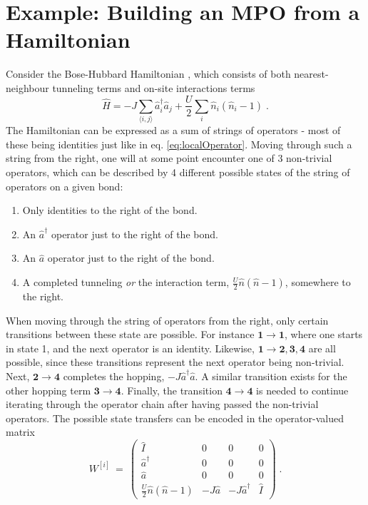 \chapter{Example: Building an MPO from a Hamiltonian}
\label{chap:buildMPO}
Consider the Bose-Hubbard Hamiltonian , which consists of both nearest-neighbour tunneling terms and on-site interactions terms
\begin{equation}
	\hat{H} = - J \sum_{\langle i,j \rangle} \hat{a}_{i}^{\dag} \hat{a}_{j} + \frac{U}{2} \sum_{i} \hat{n}_i \left( \hat{n}_i -1 \right) \; .
	\label{eq:BHhamil}
\end{equation}
The Hamiltonian can be expressed as a sum of strings of operators - most of these being identities just like in eq. \ref{eq:localOperator}. Moving through such a string from the right, one will at some point encounter one of 3 non-trivial operators, which can be described by 4 different possible states of the string of operators on a given bond:
\begin{enumerate}
	\item
	Only identities to the right of the bond.
	\item
	An $\hat{a}^{\dag}$ operator just to the right of the bond.
	\item
	An $\hat{a}$ operator just to the right of the bond.
	\item
	A completed tunneling \textit{or} the interaction term, $\frac{U}{2} \hat{n} \left( \hat{n} -1 \right)$, somewhere to the right.
\end{enumerate}
When moving through the string of operators from the right, only certain transitions between these state are possible. For instance $\boldsymbol{1 \rightarrow 1}$, where one starts in state 1, and the next operator is an identity. Likewise, $\boldsymbol{1 \rightarrow 2,3,4}$ are all possible, since these transitions represent the next operator being non-trivial. Next, $\boldsymbol{2 \rightarrow 4}$ completes the hopping, $-J \hat{a}^{\dag} \hat{a}$. A similar transition exists for the other hopping term $\boldsymbol{3 \rightarrow 4}$. Finally, the transition $\boldsymbol{4 \rightarrow 4}$ is needed to continue iterating through the operator chain after having passed the non-trivial operators. The possible state transfers can be encoded in the operator-valued matrix \cite{schollwock}
\begin{equation}
 W^{[i]} \: = \: \begin{pmatrix}
\hat{I} & 0 & 0 & 0  \\
\hat{a}^{\dag} & 0 & 0 & 0  \\
\hat{a} & 0 & 0 & 0 \\
\frac{U}{2} \hat{n} \left( \hat{n} -1 \right) & -J \hat{a} & -J \hat{a}^{\dag} &  \hat{I}
\end{pmatrix} \; .
\label{eq:MPOmatrix}
\end{equation}
